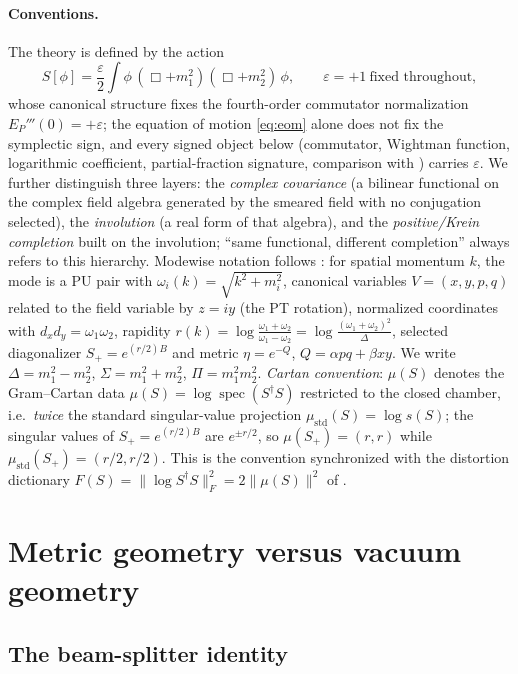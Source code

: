 \documentclass[11pt]{article}
\theoremstyle{definition}
\theoremstyle{remark}
\newcommand{\w}{\omega}
\newcommand{\dg}{\dagger}
\begin{document}
\paragraph{Conventions.}
The theory is defined by the action
\begin{equation}\label{eq:action}
S[\phi]=\frac{\varepsilon}{2}\int
\phi\,(\Box+m_1^2)(\Box+m_2^2)\,\phi,
\qquad \varepsilon=+1\ \text{fixed throughout},
\end{equation}
whose canonical structure fixes the fourth-order commutator
normalization $E_P'''(0)=+\varepsilon$; the equation of motion
\eqref{eq:eom} alone does not fix the symplectic sign, and every signed
object below (commutator, Wightman function, logarithmic coefficient,
partial-fraction signature, comparison with \cite{BT2026}) carries
$\varepsilon$.  We further distinguish three layers: the \emph{complex
covariance} (a bilinear functional on the complex field algebra
generated by the smeared field with no conjugation selected), the
\emph{involution} (a real form of that algebra), and the
\emph{positive/Krein completion} built on the involution; ``same
functional, different completion'' always refers to this hierarchy.
Modewise notation follows \cite{companion1,companion2}: for spatial
momentum $k$, the mode is a PU pair with
$\w_i(k)=\sqrt{k^2+m_i^2}$, canonical variables $V=(x,y,p,q)$ related to
the field variable by $z=iy$ (the PT rotation), normalized coordinates
with $d_xd_y=\w_1\w_2$, rapidity $r(k)=\log\frac{\w_1+\w_2}{\w_1-\w_2}
=\log\frac{(\w_1+\w_2)^2}{\Delta}$, selected diagonalizer
$S_+=e^{(r/2)B}$ and metric $\eta=e^{-Q}$, $Q=\alpha pq+\beta xy$.  We
write $\Delta=m_1^2-m_2^2$, $\Sigma=m_1^2+m_2^2$, $\Pi=m_1^2m_2^2$.
\emph{Cartan convention}: $\mu(S)$ denotes the Gram--Cartan data
$\mu(S)=\log\operatorname{spec}(S^{\dg}S)$ restricted to the closed
chamber, i.e.\ \emph{twice} the standard singular-value projection
$\mu_{\mathrm{std}}(S)=\log s(S)$; the singular values of
$S_+=e^{(r/2)B}$ are $e^{\pm r/2}$, so $\mu(S_+)=(r,r)$ while
$\mu_{\mathrm{std}}(S_+)=(r/2,r/2)$.  This is the convention
synchronized with the distortion dictionary
$F(S)=\|\log S^{\dg}S\|_F^2=2\|\mu(S)\|^2$ of \cite{companion2}.

\section{Metric geometry versus vacuum geometry}\label{sec:decoupling}

\subsection{The beam-splitter identity}
\end{document}
